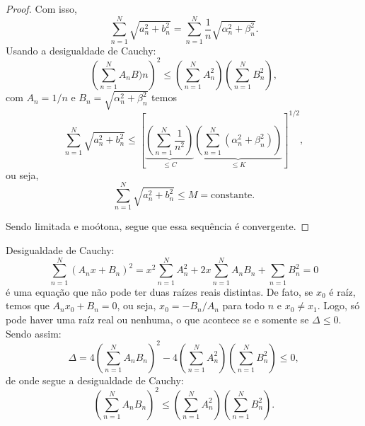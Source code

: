 \begin{proof}
  Com isso,
  \begin{dmath*}
    \sum_{n = 1}^N \sqrt{a_n^2 + b_n^2} = \sum_{n = 1}^N \frac{1}{n}
    \sqrt{\alpha_n^2 + \beta_n^2}.
  \end{dmath*}
  Usando a desigualdade de Cauchy:
  \begin{dmath*}
    \left( \sum_{n = 1}^N A_n B)n \right)^2 \leq \left( \sum_{n = 1}^N A_n^2
    \right) \left( \sum_{n = 1}^N B_n^2 \right),
  \end{dmath*}
  com $A_n = 1 / n$ e $B_n = \sqrt{\alpha_n^2 + \beta_n^2}$ temos
  \begin{dmath*}
    \sum_{n = 1}^N \sqrt{a_n^2 + b_n^2} \leq \left[ \underbrace{\left( \sum_{n
    = 1}^N \frac{1}{n^2} \right)}_{\leq C} \underbrace{\left( \sum_{n = 1}^N
    \left( \alpha_n^2 + \beta_n^2 \right) \right)}_{\leq K} \right]^{1/2},
  \end{dmath*}
  ou seja,
  \begin{dmath*}
    \sum_{n = 1}^N \sqrt{a_n^2 + b_n^2} \leq M = \text{constante}.
  \end{dmath*}

  Sendo limitada e moótona, segue que essa sequência é convergente.
\end{proof}

\begin{obs}
  Desigualdade de Cauchy:
  \begin{dmath*}
    \sum_{n = 1}^N \left( A_n x + B_n \right)^2 = x^2 \sum_{n = 1}^N A_n^2 + 2 x
    \sum_{n = 1}^N A_n B_n + \sum_{n = 1} B_n^2 = 0
  \end{dmath*}
  é uma equação que não pode ter duas raízes reais distintas. De fato, se $x_0$
  é raíz, temos que $A_n x_0 + B_n = 0$, ou seja, $x_0 = - B_n / A_n$ para todo
  $n$ e $ x_0 \neq x_1$. Logo, só pode haver uma raíz real ou nenhuma, o que
  acontece se e somente se $\Delta \leq 0$. Sendo assim:
  \begin{dmath*}
    \Delta = 4 \left( \sum_{n = 1}^N A_n B_n \right)^2 - 4 \left( \sum_{n =
    1}^N A_n^2 \right) \left( \sum_{n = 1}^N B_n^2 \right) \leq 0,
  \end{dmath*}
  de onde segue a desigualdade de Cauchy:
  \begin{dmath*}
    \left( \sum_{n = 1}^N A_n B_n \right)^2 \leq \left( \sum_{n = 1}^N A_n^2
    \right) \left( \sum_{n = 1}^N B_n^2 \right).
  \end{dmath*}
\end{obs}

